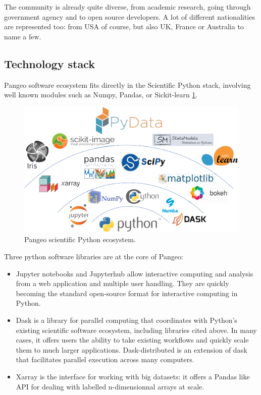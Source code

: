 \documentclass{article}
\begin{document}
The community is already quite diverse, from academic research, going through government agency and to open source developers. A lot of different nationalities are represented too: from USA of course, but also UK, France or Australia to name a few.


\subsection{Technology stack}
\label{ssec:techstack}

Pangeo software ecosystem fits directly in the Scientific Python stack, involving well known modules such as Numpy, Pandas, or Sickit-learn \ref{scipy_stack}.

\begin{figure}
  \centering
  \includegraphics[width=\columnwidth]{pangeo_python_stack.png}
  \caption{\label{scipy_stack} Pangeo scientific Python ecosystem.}
\end{figure}

Three python software libraries are at the core of Pangeo:
\begin{itemize}
\item Jupyter notebooks and Jupyterhub allow interactive computing and analysis from a web application and multiple user handling. They are quickly becoming the standard open-source format for interactive computing in Python.
\item Dask is a library for parallel computing that coordinates with Python’s existing scientific software ecosystem, including libraries cited above. In many cases, it offers users the ability to take existing workflows and quickly scale them to much larger applications. Dask-distributed is an extension of dask that facilitates parallel execution across many computers.
\item Xarray is the interface for working with big datasets: it offers a Pandas like API for dealing with labelled n-dimensionnal arrays at scale.
\end{itemize}
\end{document}
